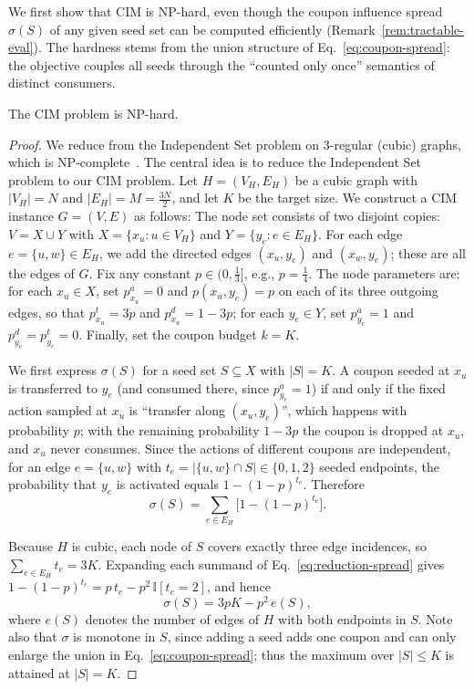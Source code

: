 \documentclass[sigconf]{acmart}
\begin{document}
We first show that CIM is NP-hard, even though the coupon influence
spread $\sigma(S)$ of any given seed set can be computed efficiently
(Remark~\ref{rem:tractable-eval}).
The hardness stems from the union structure of
Eq.~\eqref{eq:coupon-spread}: the objective couples all seeds through
the ``counted only once'' semantics of distinct consumers.

\begin{theorem}
\label{thm:nphard}
The CIM problem is NP-hard.
\end{theorem}

\begin{proof}\renewcommand{\qedsymbol}{}
We reduce from the Independent Set problem on $3$-regular (cubic)
graphs, which is NP-complete~\cite{garey1979computers,garey1976some}. The central idea is to reduce the Independent Set problem to our CIM problem.
Let $H=(V_H,E_H)$ be a cubic graph with $|V_H|=N$ and
$|E_H|=M=\tfrac{3N}{2}$, and let $K$ be the target size.
We construct a CIM instance $G=(V,E)$ as follows:
The node set consists of two disjoint copies:
$V=X\cup Y$ with $X=\{x_u: u\in V_H\}$ and
$Y=\{y_e: e\in E_H\}$.
For each edge $e=\{u,w\}\in E_H$, we add the directed edges
$(x_u,y_e)$ and $(x_w,y_e)$; these are all the edges of $G$.
Fix any constant $p\in(0,\tfrac13]$, e.g., $p=\tfrac14$.
The node parameters are:
for each $x_u\in X$, set $p_{x_u}^a=0$ and $p(x_u,y_e)=p$ on each of
its three outgoing edges, so that $p_{x_u}^t=3p$ and
$p_{x_u}^d=1-3p$;
for each $y_e\in Y$, set $p_{y_e}^a=1$ and $p_{y_e}^d=p_{y_e}^t=0$.
Finally, set the coupon budget $k=K$.

We first express $\sigma(S)$ for a seed set $S\subseteq X$ with
$|S|=K$.
A coupon seeded at $x_u$ is transferred to $y_e$ (and consumed there,
since $p_{y_e}^a=1$) if and only if the fixed action sampled at $x_u$
is ``transfer along $(x_u,y_e)$'', which happens with probability
$p$; with the remaining probability $1-3p$ the coupon is dropped at
$x_u$, and $x_u$ never consumes.
Since the actions of different coupons are independent, for an edge
$e=\{u,w\}$ with $t_e=|\{u,w\}\cap S|\in\{0,1,2\}$ seeded endpoints,
the probability that $y_e$ is activated equals
$1-(1-p)^{t_e}$.
Therefore
\begin{equation}
\label{eq:reduction-spread}
\sigma(S)
=\sum_{e\in E_H}\bigl[1-(1-p)^{t_e}\bigr].
\end{equation}

Because $H$ is cubic, each node of $S$ covers exactly three edge
incidences, so $\sum_{e\in E_H} t_e = 3K$.
Expanding each summand of Eq.~\eqref{eq:reduction-spread} gives
$1-(1-p)^{t_e}=p\,t_e-p^2\,\mathbb{I}[t_e=2]$, and hence
\begin{equation}
\label{eq:reduction-identity}
\sigma(S)=3pK-p^2\,e(S),
\end{equation}
where $e(S)$ denotes the number of edges of $H$ with both endpoints
in $S$.
Note also that $\sigma$ is monotone in $S$, since adding a seed adds
one coupon and can only enlarge the union in
Eq.~\eqref{eq:coupon-spread}; thus the maximum over $|S|\le K$ is
attained at $|S|=K$.


\end{proof}
\end{document}
